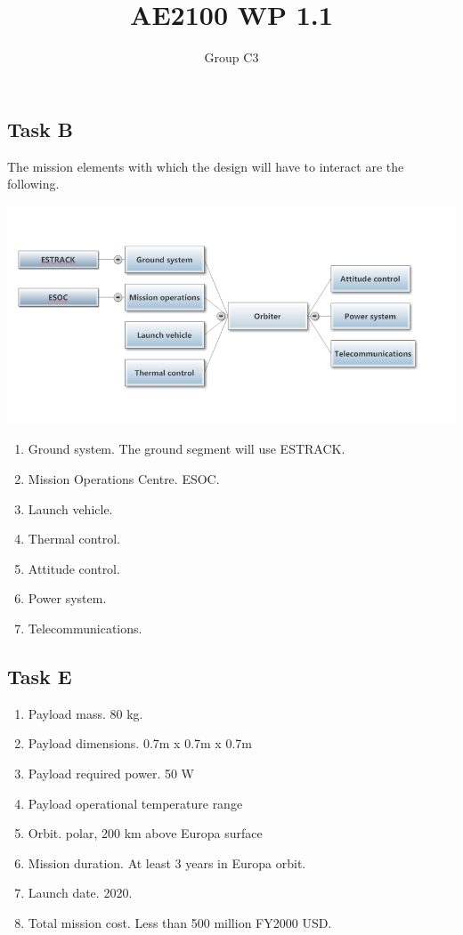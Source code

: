 \documentclass{article}
\title{AE2100 WP 1.1}
\author{Group C3}
\begin{document}
\maketitle
\subsection*{Task B}

The mission elements with which the design will have to interact are
the following.

\includegraphics[scale=.65]{block-diagram-WP1-1B.png}

\begin{enumerate}
\item{Ground system.} The ground segment will use ESTRACK.
\item{Mission Operations Centre.} ESOC.
\item{Launch vehicle.}
\item{Thermal control.}
\item{Attitude control.}
\item{Power system.}
\item{Telecommunications.}
\end{enumerate}

\subsection*{Task E}
\begin{enumerate}
  \item{Payload mass.} 80 \si{kg}.
  \item{Payload dimensions.} 0.7m x 0.7m x 0.7m
  \item{Payload required power.} 50 W
  \item{Payload operational temperature range}
  \item{Orbit.} polar, 200 km above Europa surface
  \item{Mission duration.} At least 3 years in Europa orbit.
  \item{Launch date.} 2020.
  \item{Total mission cost.} Less than 500 million FY2000 USD.
\end{enumerate}
\end{document}
